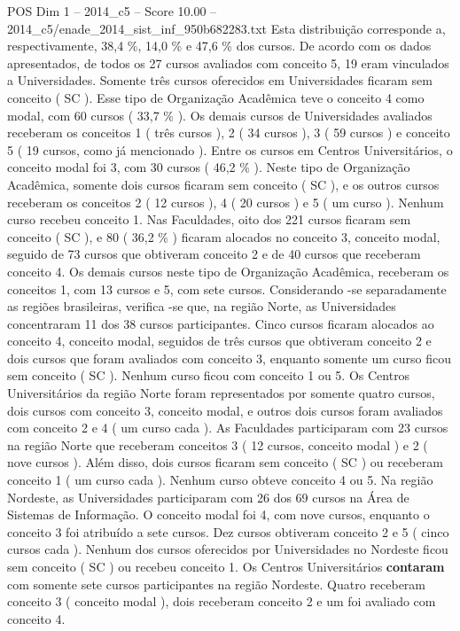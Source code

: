 \begin{textsample}{POS Dim 1 – 2014\_c5 – Score 10.00 – 2014\_c5/enade\_2014\_sist\_inf\_950b682283.txt}
Esta distribuição corresponde a, respectivamente, 38,4 \%, 14,0 \% e 47,6 \% dos cursos.
De acordo com os dados apresentados, de todos os 27 cursos avaliados com conceito 5, 19 eram vinculados a Universidades.
Somente três cursos oferecidos em Universidades ficaram sem conceito ( SC ).
Esse tipo de Organização Acadêmica teve o conceito 4 como modal, com 60 cursos ( 33,7 \% ).
Os demais cursos de Universidades avaliados receberam os conceitos 1 ( três cursos ), 2 ( 34 cursos ), 3 ( 59 cursos ) e conceito 5 ( 19 cursos, como já mencionado ).
Entre os cursos em Centros Universitários, o conceito modal foi 3, com 30 cursos ( 46,2 \% ).
Neste tipo de Organização Acadêmica, somente dois cursos ficaram sem conceito ( SC ), e os outros cursos receberam os conceitos 2 ( 12 cursos ), 4 ( 20 cursos ) e 5 ( um curso ).
Nenhum curso recebeu conceito 1.
Nas Faculdades, oito dos 221 cursos ficaram sem conceito ( SC ), e 80 ( 36,2 \% ) ficaram alocados no conceito 3, conceito modal, seguido de 73 cursos que obtiveram conceito 2 e de 40 cursos que receberam conceito 4.
Os demais cursos neste tipo de Organização Acadêmica, receberam os conceitos 1, com 13 cursos e 5, com sete cursos.
Considerando -se separadamente as regiões brasileiras, verifica -se que, na região Norte, as Universidades concentraram 11 dos 38 cursos participantes.
Cinco cursos ficaram alocados ao conceito 4, conceito modal, seguidos de três cursos que obtiveram conceito 2 e dois cursos que foram avaliados com conceito 3, enquanto somente um curso ficou sem conceito ( SC ).
Nenhum curso ficou com conceito 1 ou 5.
Os Centros Universitários da região Norte foram representados por somente quatro cursos, dois cursos com conceito 3, conceito modal, e outros dois cursos foram avaliados com conceito 2 e 4 ( um curso cada ).
As Faculdades participaram com 23 cursos na região Norte que receberam conceitos 3 ( 12 cursos, conceito modal ) e 2 ( nove cursos ).
Além disso, dois cursos ficaram sem conceito ( SC ) ou receberam conceito 1 ( um curso cada ).
Nenhum curso obteve conceito 4 ou 5.
Na região Nordeste, as Universidades participaram com 26 dos 69 cursos na Área de Sistemas de Informação.
O conceito modal foi 4, com nove cursos, enquanto o conceito 3 foi atribuído a sete cursos.
Dez cursos obtiveram conceito 2 e 5 ( cinco cursos cada ).
Nenhum dos cursos oferecidos por Universidades no Nordeste ficou sem conceito ( SC ) ou recebeu conceito 1.
Os Centros Universitários \textbf{contaram} com somente sete cursos participantes na região Nordeste.
Quatro receberam conceito 3 ( conceito modal ), dois receberam conceito 2 e um foi avaliado com conceito 4.

\end{textsample}
